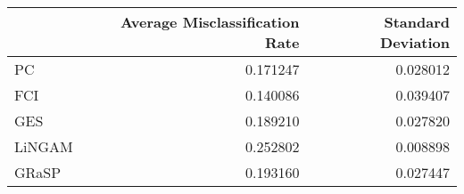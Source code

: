 \begin{tabular}{lrr}
\toprule
{} &  Average Misclassification Rate &  Standard Deviation \\
\midrule
PC     &                        0.171247 &            0.028012 \\
FCI    &                        0.140086 &            0.039407 \\
GES    &                        0.189210 &            0.027820 \\
LiNGAM &                        0.252802 &            0.008898 \\
GRaSP  &                        0.193160 &            0.027447 \\
\bottomrule
\end{tabular}
